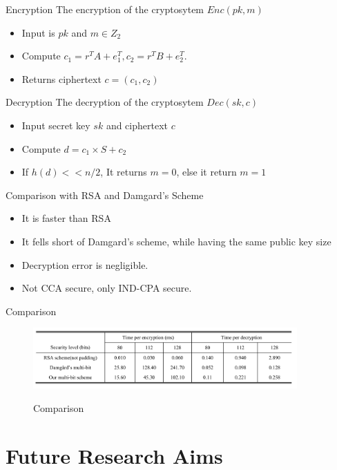 \documentclass{beamer}
\begin{document}
\begin{frame}{Encryption}
  The encryption of the cryptosytem $ Enc(pk, m) $
  \begin{itemize}
    \item Input is $pk$ and $ m \in Z_2 $
    \item Compute $c_1 = r^T A + e_1^T, c_2 = r^T B + e^T_2$.
    \item Returns ciphertext $c = (c_1, c_2)$
  \end{itemize}
\end{frame}

\begin{frame}{Decryption}
  The decryption of the cryptosytem $ Dec(sk, c) $
  \begin{itemize}
    \item Input secret key $sk$ and ciphertext $c$
    \item Compute $ d = c_1 \times S + c_2 $
    \item If $ h(d) << n/2 $, It returns $m = 0$, else it return $m=1$
  \end{itemize}
\end{frame}

\begin{frame}{Comparison with RSA and Damgard's Scheme}
  \begin{itemize}
    \item It is faster than RSA
    \item It fells short of Damgard's scheme, while having the same public key size
    \item Decryption error is negligible.
    \item Not CCA secure, only IND-CPA secure.
  \end{itemize}
\end{frame}

\begin{frame}{Comparison}
  \begin{figure}
    \centering
    \caption{Comparison}
    \includegraphics[width=0.9\textwidth]{comparison.png}
    \label{fig:comparison}
  \end{figure}
\end{frame}

\section{Future Research Aims}
\end{document}
